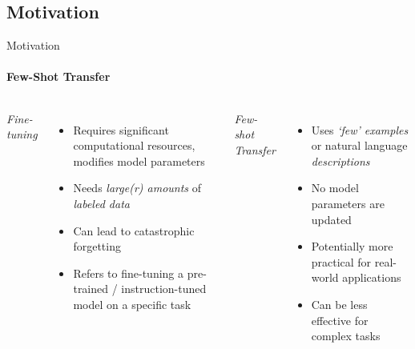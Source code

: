 \subsection{Motivation}
\begin{frame}{Motivation}
\framesubtitle{Few-Shot Transfer}
  \vspace{-1em}
  \begin{columns}[T]
      \centering \emph{Fine-tuning}
      \begin{itemize}
        \item Requires significant computational resources, modifies model parameters
        \item Needs \emph{large(r) amounts} of \emph{labeled data}
        \item Can lead to catastrophic forgetting
        \item Refers to fine-tuning a pre-trained / instruction-tuned model on a specific task
      \end{itemize}
    \centering \emph{Few-shot Transfer}
    \begin{itemize}
        \item Uses \emph{`few' examples} or natural language \emph{descriptions}
        \item No model parameters are updated
        \item Potentially more practical for real-world applications~
        \item Can be less effective for complex tasks
    \end{itemize}
  \end{columns}
\end{frame}


